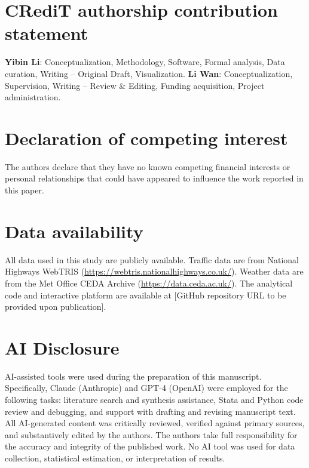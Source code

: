 \documentclass[review]{elsarticle}
\begin{document}
\section*{CRediT authorship contribution statement}

\textbf{Yibin Li}: Conceptualization, Methodology, Software, Formal analysis, Data curation, Writing -- Original Draft, Visualization. \textbf{Li Wan}: Conceptualization, Supervision, Writing -- Review \& Editing, Funding acquisition, Project administration.

\section*{Declaration of competing interest}

The authors declare that they have no known competing financial interests or personal relationships that could have appeared to influence the work reported in this paper.

\section*{Data availability}

All data used in this study are publicly available. Traffic data are from National Highways WebTRIS (\url{https://webtris.nationalhighways.co.uk/}). Weather data are from the Met Office CEDA Archive (\url{https://data.ceda.ac.uk/}). The analytical code and interactive platform are available at [GitHub repository URL to be provided upon publication].

\section*{AI Disclosure}

AI-assisted tools were used during the preparation of this manuscript. Specifically, Claude (Anthropic) and GPT-4 (OpenAI) were employed for the following tasks: literature search and synthesis assistance, Stata and Python code review and debugging, and support with drafting and revising manuscript text. All AI-generated content was critically reviewed, verified against primary sources, and substantively edited by the authors. The authors take full responsibility for the accuracy and integrity of the published work. No AI tool was used for data collection, statistical estimation, or interpretation of results.




\end{document}
